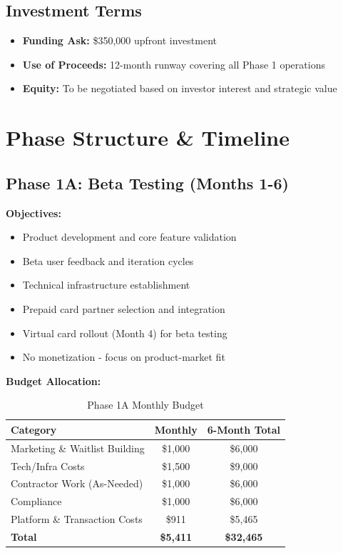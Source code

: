 \documentclass[11pt,letterpaper]{article}
\begin{document}
\subsection{Investment Terms}
\begin{itemize}
\item \textbf{Funding Ask:} \$350,000 upfront investment
\item \textbf{Use of Proceeds:} 12-month runway covering all Phase 1 operations
\item \textbf{Equity:} To be negotiated based on investor interest and strategic value
\end{itemize}

\newpage

\section{Phase Structure \& Timeline}

\subsection{Phase 1A: Beta Testing (Months 1-6)}

\textbf{Objectives:}
\begin{itemize}
\item Product development and core feature validation
\item Beta user feedback and iteration cycles
\item Technical infrastructure establishment
\item Prepaid card partner selection and integration
\item Virtual card rollout (Month 4) for beta testing
\item No monetization - focus on product-market fit
\end{itemize}

\textbf{Budget Allocation:}
\begin{table}[h]
\centering
\caption{Phase 1A Monthly Budget}
\begin{tabular}{|l|c|c|}
\hline
\textbf{Category} & \textbf{Monthly} & \textbf{6-Month Total} \\
\hline
Marketing \& Waitlist Building & \$1,000& \$6,000\\
Tech/Infra Costs & \$1,500& \$9,000\\
Contractor Work (As-Needed) & \$1,000 & \$6,000 \\
Compliance & \$1,000 & \$6,000 \\
Platform \& Transaction Costs & \$911& \$5,465\\
\textbf{Total} & \textbf{\$5,411}& \textbf{\$32,465}\\
\hline
\end{tabular}
\end{table}
\end{document}
